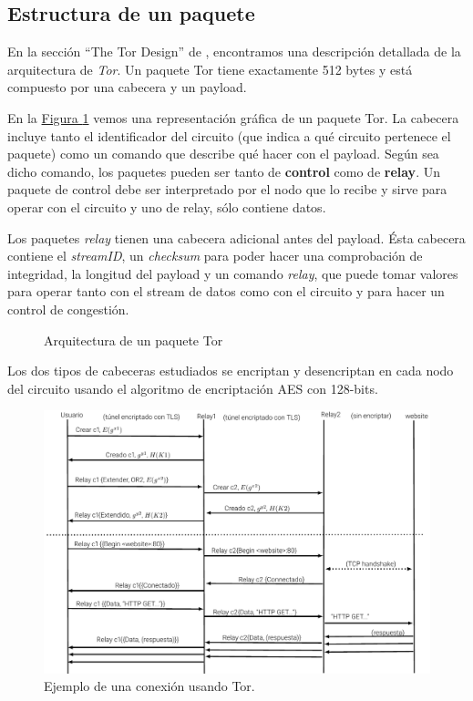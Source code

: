 \documentclass[10pt,a4paper,spanish]{article}
\begin{document}
\subsection{Estructura de un paquete}
En la sección ``The Tor Design'' de \cite{design}, encontramos una descripción detallada de la arquitectura de \textit{Tor}. Un paquete Tor tiene exactamente 512 bytes y está compuesto por una cabecera y un payload. 

En la \hyperref[paquete]{Figura \ref*{paquete}} vemos una representación gráfica de un paquete Tor. La cabecera incluye tanto el identificador del circuito (que indica a qué circuito pertenece el paquete) como un comando que describe qué hacer con el payload. Según sea dicho comando, los paquetes pueden ser tanto de \textbf{control} como de \textbf{relay}. Un paquete de control debe ser interpretado por el nodo que lo recibe y sirve para operar con el circuito y uno de relay, sólo contiene datos.

Los paquetes \textit{relay} tienen una cabecera adicional antes del payload. Ésta cabecera contiene el \textit{streamID}, un \textit{checksum} para poder hacer una comprobación de integridad, la longitud del payload y un comando \textit{relay}, que puede tomar valores para operar tanto con el stream de datos como con el circuito y para hacer un control de congestión.

\begin{figure}[!h]
    \centering
    
    \caption{Arquitectura de un paquete Tor}
    \label{paquete}
\end{figure}

Los dos tipos de cabeceras estudiados se encriptan y desencriptan en cada nodo del circuito usando el algoritmo de encriptación AES con 128-bits.
\begin{figure}[!h]
    \centering
    \includegraphics[width=1\textwidth]{comunicaciones}
    \caption{Ejemplo de una conexión usando Tor.}
    \label{comunicaciones}
\end{figure}
\end{document}
